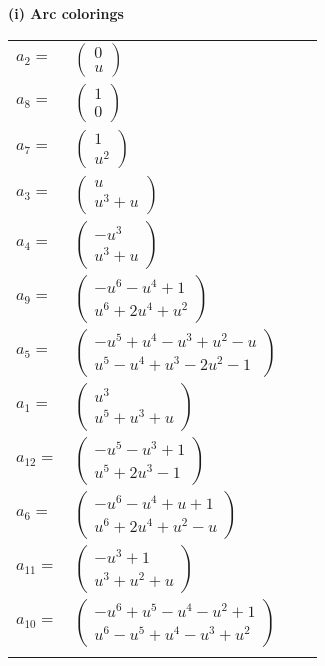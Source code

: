 \documentclass[1p]{elsarticle_modified}
\theoremstyle{definition}
\begin{document}
\flushleft \textbf{(i) Arc colorings}\\
\begin{tabular}{m{7pt} m{180pt} m{7pt} m{180pt} }
\flushright $a_{2}=$&$\begin{pmatrix}0\\u\end{pmatrix}$ \\
\flushright $a_{8}=$&$\begin{pmatrix}1\\0\end{pmatrix}$ \\
\flushright $a_{7}=$&$\begin{pmatrix}1\\u^2\end{pmatrix}$ \\
\flushright $a_{3}=$&$\begin{pmatrix}u\\u^3+u\end{pmatrix}$ \\
\flushright $a_{4}=$&$\begin{pmatrix}- u^3\\u^3+u\end{pmatrix}$ \\
\flushright $a_{9}=$&$\begin{pmatrix}- u^6- u^4+1\\u^6+2 u^4+u^2\end{pmatrix}$ \\
\flushright $a_{5}=$&$\begin{pmatrix}- u^5+u^4- u^3+u^2- u\\u^5- u^4+u^3-2 u^2-1\end{pmatrix}$ \\
\flushright $a_{1}=$&$\begin{pmatrix}u^3\\u^5+u^3+u\end{pmatrix}$ \\
\flushright $a_{12}=$&$\begin{pmatrix}- u^5- u^3+1\\u^5+2 u^3-1\end{pmatrix}$ \\
\flushright $a_{6}=$&$\begin{pmatrix}- u^6- u^4+u+1\\u^6+2 u^4+u^2- u\end{pmatrix}$ \\
\flushright $a_{11}=$&$\begin{pmatrix}- u^3+1\\u^3+u^2+u\end{pmatrix}$ \\
\flushright $a_{10}=$&$\begin{pmatrix}- u^6+u^5- u^4- u^2+1\\u^6- u^5+u^4- u^3+u^2\end{pmatrix}$\\&\end{tabular}
\end{document}
